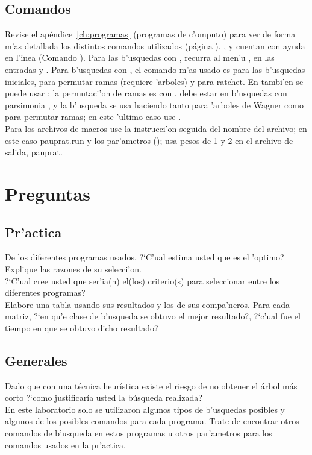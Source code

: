 \subsection{Comandos}
\noindent
Revise el ap\'endice~\ref{ch:programas} (programas de c'omputo) para ver de forma m'as detallada los distintos comandos utilizados (p\'agina \pageref{ch:programas}). ,  y  cuentan con ayuda en l'inea (Comando ). Para las b'usquedas con , recurra al men'u , en las entradas  y . Para b'usquedas con , el comando m'as usado es   para las b'usquedas iniciales,  para permutar ramas (requiere 'arboles) y   para ratchet. En  tambi'en se puede usar ; la permutaci'on de ramas es con .  debe estar en b'usquedas con parsimonia , y la b'usqueda se usa haciendo   tanto para 'arboles de Wagner como para permutar ramas; en este 'ultimo caso use .\\
Para los archivos de macros use la instrucci'on  seguida del nombre del archivo; en este caso pauprat.run y los par'ametros ();  usa pesos de 1 y 2 en el archivo de salida, pauprat.

\section{Preguntas}
\subsection{Pr'actica}
\noindent
De los diferentes programas usados, ?`C'ual estima usted que es el 'optimo? Explique las razones de su selecci'on.\\
?`C'ual cree usted que ser'ia(n) el(los) criterio(s) para seleccionar entre los diferentes programas?\\ 
Elabore una tabla usando sus resultados y los de sus compa'neros. Para cada matriz, ?`en qu'e clase de b'usqueda se obtuvo el mejor resultado?, ?`c'ual fue el tiempo en que se obtuvo dicho resultado?
\subsection{Generales}
\noindent
Dado que con una t\'ecnica heur\'istica existe el riesgo de no obtener el \'arbol m\'as corto ?`como justificar\'ia usted la b\'usqueda realizada?\\
En este laboratorio solo se utilizaron algunos tipos de b'usquedas posibles y algunos de los posibles comandos para cada programa. Trate de encontrar otros comandos de b'usqueda en estos programas u otros par'ametros para los comandos usados en la pr'actica.
